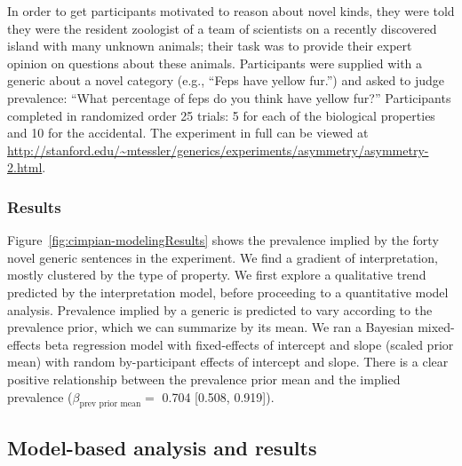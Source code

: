 \documentclass[floatsintext,doc]{apa6}
\theoremstyle{definition}
\theoremstyle{definition}
\theoremstyle{definition}
\theoremstyle{remark}
\begin{document}
In order to get participants motivated to reason about novel kinds, they
were told they were the resident zoologist of a team of scientists on a
recently discovered island with many unknown animals; their task was to
provide their expert opinion on questions about these animals.
Participants were supplied with a generic about a novel category (e.g.,
\enquote{Feps have yellow fur.}) and asked to judge prevalence:
\enquote{What percentage of feps do you think have yellow fur?}
Participants completed in randomized order 25 trials: 5 for each of the
biological properties and 10 for the accidental. The experiment in full
can be viewed at
\url{http://stanford.edu/~mtessler/generics/experiments/asymmetry/asymmetry-2.html}.

\subsubsection{Results}\label{results}

Figure~\ref{fig:cimpian-modelingResults} shows the prevalence implied by
the forty novel generic sentences in the experiment. We find a gradient
of interpretation, mostly clustered by the type of property. We first
explore a qualitative trend predicted by the interpretation model,
before proceeding to a quantitative model analysis. Prevalence implied
by a generic is predicted to vary according to the prevalence prior,
which we can summarize by its mean. We ran a Bayesian mixed-effects beta
regression model with fixed-effects of intercept and slope (scaled prior
mean) with random by-participant effects of intercept and slope. There
is a clear positive relationship between the prevalence prior mean and
the implied prevalence (\(\beta_{\text{prev prior mean}}=\) 0.704
{[}0.508, 0.919{]}).

\subsection{Model-based analysis and
results}\label{model-based-analysis-and-results}
\end{document}
